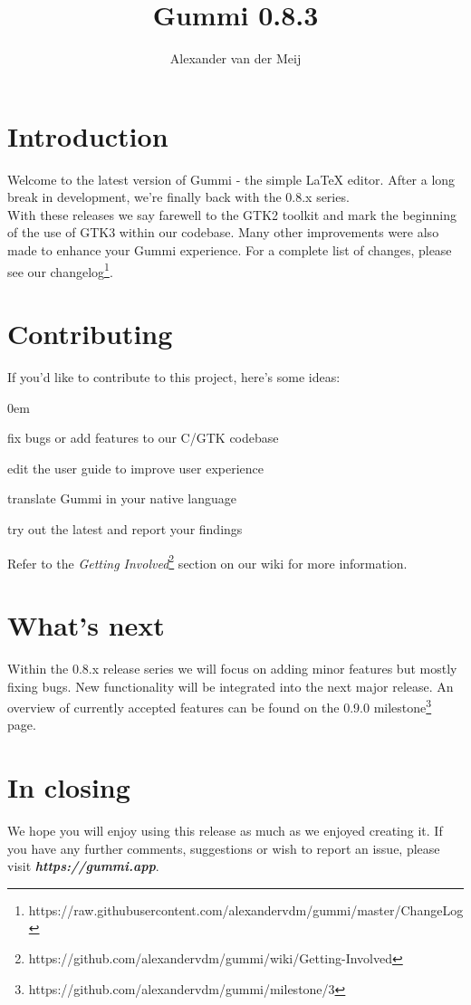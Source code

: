 \documentclass[11pt]{article}
\title{\textbf{Gummi 0.8.3}}
\author{Alexander van der Meij}
\date{}
\begin{document}
\maketitle
\thispagestyle{empty}

\section{Introduction}
Welcome to the latest version of Gummi - the simple {\LaTeX} editor. After a long break in development, we're finally back with the 0.8.x series.\\
With these releases we say farewell to the GTK2 toolkit and mark the beginning of the use of GTK3 within our codebase. Many other improvements were also made to enhance your Gummi experience. For a complete list of changes, please see our changelog\footnote{https://raw.githubusercontent.com/alexandervdm/gummi/master/ChangeLog}. 

\section{Contributing}
If you'd like to contribute to this project, here's some ideas:
\begin{description}
\addtolength{\itemindent}{0.80cm}
\itemsep0em 
\item[Development] fix bugs or add features to our C/GTK codebase
\item[Documentation] edit the user guide to improve user experience
\item[Localization] translate Gummi in your native language
\item[Testing] try out the latest and report your findings
\end{description}
Refer to the \emph{Getting Involved}\footnote{https://github.com/alexandervdm/gummi/wiki/Getting-Involved} section on our wiki for more information. 

\section{What's next}
Within the 0.8.x release series we will focus on adding minor features but mostly fixing bugs. New functionality will be integrated into the next major release. An overview of currently accepted features can be found on the 0.9.0 milestone\footnote{https://github.com/alexandervdm/gummi/milestone/3} page.

\section{In closing}
We hope you will enjoy using this release as much as we enjoyed creating it. If you have any further comments, suggestions or wish to report an issue, please visit \emph{\textbf{https://gummi.app}}. 
\end{document}
